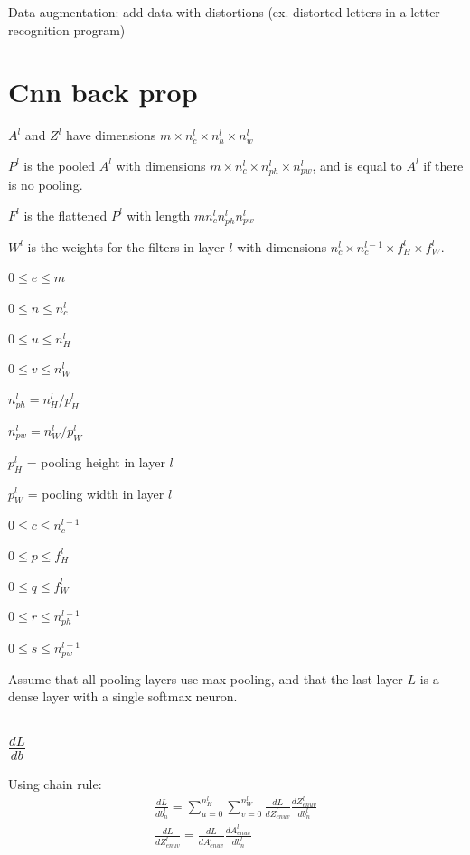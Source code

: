 \documentclass[12pt]{article}
\begin{document}
Data augmentation: add data with distortions (ex. distorted letters in a letter recognition program)

\section{Cnn back prop}

$A^l$ and $Z^l$ have dimensions $m \times n_c^l \times n_h^l \times n_w^l$

$P^l$ is the pooled $A^l$ with dimensions $m \times n_c^l \times n^l_{ph} \times n^l_{pw}$,
and is equal to $A^l$ if there is no pooling.

$F^l$ is the flattened $P^l$ with length $m n_c^l n_{ph}^l n_{pw}^l$

$W^l$ is the weights for the filters in layer $l$ with dimensions $n_c^l \times n_c^{l-1}
\times f_H^l \times f_W^l$.

$0 \le e \le m$

$0 \le n \le n_c^l$

$0 \le u \le n_H^l$

$0 \le v \le n_W^l$

$n_{ph}^l = n_H^l/p^l_H$

$n_{pw}^l = n_W^l/p^l_W$

$p^l_H$ = pooling height in layer $l$

$p^l_W$ = pooling width in layer $l$

$0 \le c \le n_c^{l-1}$

$0 \le p \le f_H^l$

$0 \le q \le f_W^l$

$0 \le r \le n^{l-1}_{ph}$

$0 \le s \le n^{l-1}_{pw}$

Assume that all pooling layers use max pooling, and that the last layer $L$ is a dense layer with
a single softmax neuron.

\subsection{$\frac{dL}{db}$}

Using chain rule:
\begin{gather*}
    \frac{dL}{db^l_n} = \sum_{u=0}^{n_H^l} \sum_{v=0}^{n_W^l}
                        \frac{dL}{dZ^l_{enuv}} \frac{dZ^l_{enuv}}{db^l_n}\\
    \frac{dL}{dZ^l_{enuv}} = \frac{dL}{dA^l_{enuv}} \frac{dA^l_{enuv}}{db^l_n}
\end{gather*}
\end{document}
